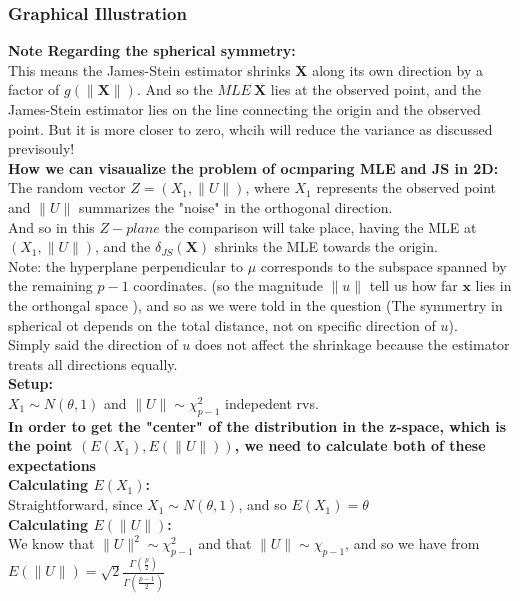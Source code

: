 \documentclass[12pt]{article}
\begin{document}
\subsubsection*{Graphical Illustration}
\textbf{Note Regarding the spherical symmetry:} \\
This means the James-Stein estimator shrinks $\boldsymbol{X}$ along its own direction by a factor of $g(\|\boldsymbol{X}\|)$. And so the $MLE \ \boldsymbol{X}$ lies at the observed point, and the James-Stein estimator lies on the line connecting the origin and the observed point. But it is more closer to zero, whcih will reduce the variance as discussed previsouly! \\
\textbf{How we can visaualize the problem of ocmparing MLE and JS in 2D:} \\
The random vector $Z = (X_1, \|U\|)$, where $X_1$ represents the observed point and $\|U\|$ summarizes the "noise" in the orthogonal direction. \\ 
And so in this $Z-plane$ the comparison will take place, having the MLE at $(X_1,\|U\|)$, and the $\delta_{JS}(\boldsymbol{X})$ shrinks the MLE towards the origin. \\
Note: the hyperplane perpendicular to $\mu$ corresponds to the subspace spanned by the remaining $p-1$ coordinates. (so the magnitude $\|u\|$ tell us how far $\boldsymbol{x}$ lies in the orthongal space ), and so as we were told in the question (The symmertry in spherical ot depends on the total distance, not on specific direction of $u$). \\
Simply said the direction of $u$ does not affect the shrinkage because the estimator treats all directions equally. \\
\textbf{Setup:} \\
$X_1 \sim N(\theta,1)$ and $\|U\| \sim \chi^2_{p-1}$ indepedent rvs. \\ 
\textbf{In order to get the "center" of the distribution in the z-space, which is the point $(E(X_1), E(\|U\|))$, we need to calculate both of these expectations}\\
\textbf{Calculating $E(X_1)$:} \\
Straightforward, since $X_1 \sim N(\theta,1)$, and so $E(X_1) = \theta$ \\
\textbf{Calculating $E(\|U\|)$:} \\
We know that $\|U\|^2 \sim \chi^2_{p-1}$ and that $\|U\| \sim \chi_{p-1}$, and so we have from \cite{chi_distribution} $E(\|U\|) = \sqrt{2} \frac{\Gamma(\frac{p}{2})}{\Gamma(\frac{p-1}{2})}$
\end{document}
